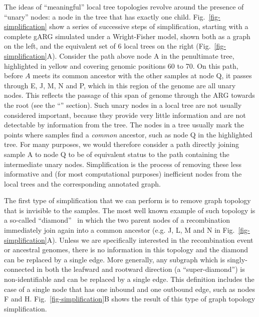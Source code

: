 \documentclass{article}
\begin{document}
The ideas of ``meaningful'' local tree topologies revolve around the
presence of ``unary'' nodes: a node in the tree that has exactly
one child. Fig.~\ref{fig-simplification} show a series of successive steps of
simplification, starting with a complete gARG simulated under a Wright-Fisher
model, shown both as a graph on the left, and the equivalent set of 6
local trees on the right (Fig.~\ref{fig-simplification}A). Consider the path above node
\textsf{A} in the penultimate tree, highlighted in yellow and covering genomic positions
60 to 70. On this path, before $A$ meets its common ancestor with the other samples at
node \textsf{Q}, it passes through  \textsf{E},  \textsf{J},  \textsf{M},  \textsf{N} and 
\textsf{P}, which in this region of the genome are all unary nodes. This reflects the
passage of this span of genome through the ARG towards the root (see the
``'' section).
Such unary nodes in a local tree are not usually considered important,
because they provide very little information and are not
detectable by information from the tree. %
The nodes in a tree usually mark the points where samples find a
 \emph{common} ancestor, such as node \textsf{Q} in the highlighted
tree. For many purposes, we would therefore consider a path directly
joining sample \textsf{A} to node \textsf{Q} to be of equivalent status to the path
containing the intermediate unary nodes. Simplification is the process of removing
these less informative and (for most computational purposes) inefficient nodes
from the local trees and the corresponding annotated graph.

The first type of simplification that we can perform is to remove
graph topology that is invisible to the samples. The most well
known example of such topology is a so-called
``diamond''~\citep{rasmussen2014genome}
in which the two parent nodes of a recombination immediately
join again into a common ancestor (e.g. \textsf{J}, \textsf{L}, \textsf{M}
and  \textsf{N} in Fig.~\ref{fig-simplification}A).
Unless we are specifically
interested in the recombination event or ancestral genomes,
there is no information in this topology and the diamond can be
replaced by a single edge. More generally, any
subgraph which is singly-connected in both the leafward and
rootward direction (a ``super-diamond'') is non-identifiable and can be
replaced by a single edge. This definition includes the case
of a single node that has one inbound and one outbound edge, such as
nodes \textsf{F} and \textsf{H}.
Fig.~\ref{fig-simplification}B shows the result of this type of
graph topology simplification.
\end{document}

